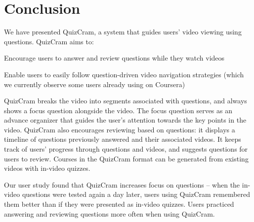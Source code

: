 \documentclass{sigchi}
\begin{document}
\pagebreak

\section{Conclusion}
We have presented QuizCram, a system that guides users' video viewing using questions. QuizCram aims to:

\begin{compactitem}
\item Encourage users to answer and review questions while they watch videos
\item Enable users to easily follow question-driven video navigation strategies (which we currently observe some users already using on Coursera)
\end{compactitem}

QuizCram breaks the video into segments associated with questions, and always shows a focus question alongside the video. The focus question serves as an advance organizer that guides the user's attention towards the key points in the video. QuizCram also encourages reviewing based on questions: it displays a timeline of questions previously answered and their associated videos. It keeps track of users' progress through questions and videos, and suggests questions for users to review. Courses in the QuizCram format can be generated from existing videos with in-video quizzes. %


Our user study found that QuizCram increases focus on questions -- when the in-video questions were tested again a day later, users using QuizCram remembered them better than if they were presented as in-video quizzes. Users practiced answering and reviewing questions more often when using QuizCram. %
\end{document}
